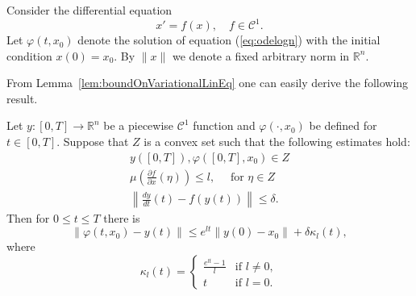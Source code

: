 Consider the differential equation
\begin{equation}
  x'=f(x), \quad \mbox{$f \in \mathcal C^1$}. \label{eq:odelogn}
\end{equation}
Let $\varphi(t,x_0)$  denote the solution of equation
(\ref{eq:odelogn}) with the initial condition $x(0)=x_0$. By $\|x
\|$ we denote a fixed arbitrary norm in $\mathbb{R}^n$.


From Lemma~\ref{lem:boundOnVariationalLinEq} one can easily derive the following result.
\begin{lemma}
\label{lem:estmLogN} 
Let $y:[0,T] \to \mathbb{R}^n$ be a piecewise
$\mathcal C^1$ function and $\varphi(\cdot,x_0)$ be defined for $t \in
[0,T]$. Suppose that $Z$ is a convex set such that   the following
estimates hold:
\begin{eqnarray*}
  y([0,T]), \varphi([0,T], x_0) \in Z  \\
  \mu\left(\frac{\partial f}{\partial x}(\eta)\right) \leq l,\quad \mbox{ for $\eta \in Z$} \\
  \left\| \frac{dy}{dt}(t) - f(y(t)) \right\| \leq \delta.
\end{eqnarray*}
Then for $0 \leq t \leq T$ there is
\begin{displaymath}
 \| \varphi(t,x_0) - y(t)  \| \leq e^{lt}  \|y(0) - x_0 \| + \delta \kappa_l(t),
\end{displaymath}
where
\begin{equation}\label{eq:kappa}
	\kappa_l(t) = \begin{cases}
		\frac{e^{lt} -1}{l}& \mbox{if $l \neq 0$},\\
		t & \mbox{if $l =0$}.
	\end{cases}
\end{equation}
\end{lemma}



